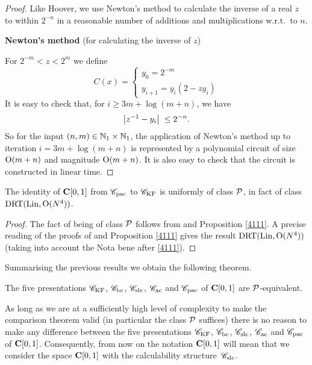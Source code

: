 \begin{proof}
Like Hoover, we use Newton's method to calculate 
the inverse of a real $z$ to within $2^{-n}$ in a reasonable number of additions and multiplications w.r.t.\ to $n$.

\smallskip \noindent 
{\bf Newton's method} (for calculating the inverse of $z$)

\noindent 
 For $2^{-m} < z < 2^m$ we define 
\[
C(x) = \left\{
\begin{array}{l} 
y_0 = 2^{-m} 
\\
y_{i+1} = y_i (2- zy_i) 
\end{array}
\right.
\]
It is easy to check that, for $i \geq 3m + \log(m+n)$, we have
\[
\left|{ z^{-1} - y_i }\right|\;  \leq 2^{-n}.
\]
So for the input $(n,m) \in \mathbb {N}_1 \times \mathbb {N}_1$, the application of Newton's method up to iteration $i = 3m + \log(m+n)$ is represented by a polynomial circuit of size ${\rm O}(m+n)$ and magnitude ${\rm O}(m+n)$. It is also easy to check that the circuit is constructed in linear time.
\end{proof}


\begin{proposition} \label{4210}
The identity of ${{\bf C}[0,1]}$ from ${{{\mathscr C}}_{\rm pac}}$ to ${{{\mathscr C}}_{\rm KF}}$ is uniformly of class ${\cal P}$, in fact of class ${\rm DRT}({\rm Lin}, {\rm O}(N^4))$.
\end{proposition} 

\begin{proof}
The fact of being of class ${\cal P}$ follows from  and Proposition \ref{4111}. A precise reading of the proofs of  and Proposition \ref{4111} gives the result ${\rm DRT}({\rm Lin},{\rm O}(N^4))$ (taking into account the Nota bene after \ref{4111}). 
\end{proof}
%

Summarising the previous results we obtain the following theorem.

\begin{theorem} \label{4211}
The five presentations ${{{\mathscr C}}_{\rm KF}}$, ${{{\mathscr C}}_{\rm bc}}$, ${{{\mathscr C}}_{\rm slc}}$, ${{{\mathscr C}}_{\rm ac}}$ and ${{{\mathscr C}}_{\rm pac}}$ of ${{\bf C}[0,1]}$ are ${\cal P}$-equivalent.
\end{theorem}

\begin{notation} \label{4212}
As long as we are at a sufficiently high level of complexity to make the comparison theorem valid (in particular the class ${\cal P}$ suffices) there is no reason to make any difference between the five presentations ${{{\mathscr C}}_{\rm KF}}$, ${{{\mathscr C}}_{\rm bc}}$, ${{{\mathscr C}}_{\rm slc}}$, ${{{\mathscr C}}_{\rm ac}}$ and ${{{\mathscr C}}_{\rm pac}}$ of ${{\bf C}[0,1]}$. 
Consequently, from now on the notation ${{\bf C}[0,1]}$ will mean that we consider the space ${{\bf C}[0,1]}$ with the calculability structure~${{{\mathscr C}}_{\rm slc}}$.
\end{notation}

